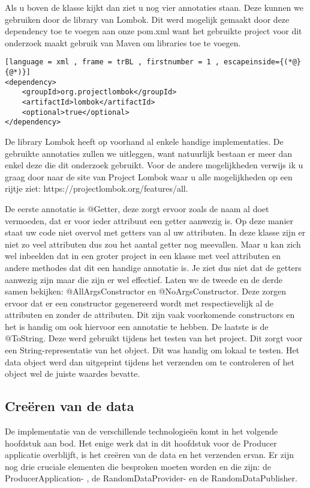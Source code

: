Als u boven de klasse kijkt dan ziet u nog vier annotaties staan. Deze kunnen we gebruiken door de library van Lombok. Dit werd mogelijk gemaakt door deze dependency toe te voegen aan onze pom.xml want het gebruikte project voor dit onderzoek maakt gebruik van Maven om libraries toe te voegen.

\begin{lstlisting}[language = xml , frame = trBL , firstnumber = 1 , escapeinside={(*@}{@*)}]
<dependency>
    <groupId>org.projectlombok</groupId>
    <artifactId>lombok</artifactId>
    <optional>true</optional>
</dependency>
\end{lstlisting}

De library Lombok heeft op voorhand al enkele handige implementaties. De gebruikte annotaties zullen we uitleggen, want natuurlijk bestaan er meer dan enkel deze die dit onderzoek gebruikt. Voor de andere mogelijkheden verwijs ik u graag door naar de site van Project Lombok waar u alle mogelijkheden op een rijtje ziet: https://projectlombok.org/features/all. 

De eerste annotatie is @Getter, deze zorgt ervoor zoals de naam al doet vermoeden, dat er voor ieder attribuut een getter aanwezig is. Op deze manier staat uw code niet overvol met getters van al uw attributen. In deze klasse zijn er niet zo veel attributen dus zou het aantal getter nog meevallen. Maar u kan zich wel inbeelden dat in een groter project in een klasse met veel attributen en andere methodes dat dit een handige annotatie is. Je ziet dus niet dat de getters aanwezig zijn maar die zijn er wel effectief. Laten we de tweede en de derde samen bekijken: @AllArgsConstructor en @NoArgsConstructor. Deze zorgen ervoor dat er een constructor gegenereerd wordt met respectievelijk al de attributen en zonder de attributen. Dit zijn vaak voorkomende constructors en het is handig om ook hiervoor een annotatie te hebben. De laatste  is de @ToString. Deze werd gebruikt tijdens het testen van het project. Dit zorgt voor een String-representatie van het object. Dit was handig om lokaal te testen. Het data object werd dan uitgeprint tijdens het verzenden om te controleren of het object wel de juiste waardes bevatte.

\subsection{Creëren van de data}
De implementatie van de verschillende technologieën komt in het volgende hoofdstuk aan bod. Het enige werk dat in dit hoofdstuk voor de Producer applicatie overblijft, is het creëren van de data en het verzenden ervan. Er zijn nog drie cruciale elementen die besproken moeten worden en die zijn: de ProducerApplication- , de RandomDataProvider- en de RandomDataPublisher.

